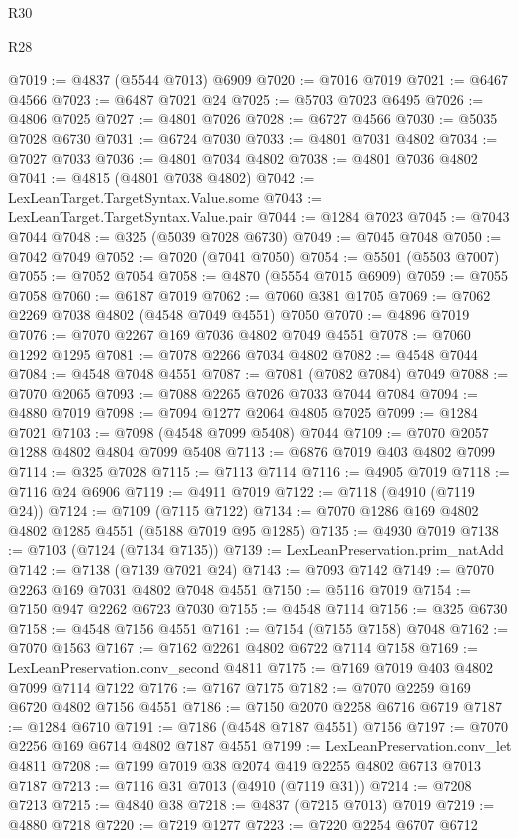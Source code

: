 \begin{lexlean}{R30}
\begin{lexlean}{R28}
\begin{coremodule}
{{{{{{{{{{{{{{{{{{{{{{{{{{{{{{{{{{{{{{{{{{{{{{{{{{{{{{{{{{{{{{{{{{{{{{{{{{{{{{{{{{{{{{{{{{{{{{{{{{{{{{{{{{{{{{{{{{{{{{{{{{{{{{{{{{{{{{{{{{{{{{{@7019 := @4837 (@5544 @7013) @6909
@7020 := @7016 @7019
@7021 := @6467 @4566
@7023 := @6487 @7021 @24
@7025 := @5703 @7023 @6495
@7026 := @4806 @7025
@7027 := @4801 @7026
@7028 := @6727 @4566
@7030 := @5035 @7028 @6730
@7031 := @6724 @7030
@7033 := @4801 @7031 @4802
@7034 := @7027 @7033
@7036 := @4801 @7034 @4802
@7038 := @4801 @7036 @4802
@7041 := @4815 (@4801 @7038 @4802)
@7042 := LexLeanTarget.TargetSyntax.Value.some
@7043 := LexLeanTarget.TargetSyntax.Value.pair
@7044 := @1284 @7023
@7045 := @7043 @7044
@7048 := @325 (@5039 @7028 @6730)
@7049 := @7045 @7048
@7050 := @7042 @7049
@7052 := @7020 (@7041 @7050)
@7054 := @5501 (@5503 @7007)
@7055 := @7052 @7054
@7058 := @4870 (@5554 @7015 @6909)
@7059 := @7055 @7058
@7060 := @6187 @7019
@7062 := @7060 @381 @1705
@7069 := @7062 @2269 @7038 @4802 (@4548 @7049 @4551) @7050
@7070 := @4896 @7019
@7076 := @7070 @2267 @169 @7036 @4802 @7049 @4551
@7078 := @7060 @1292 @1295
@7081 := @7078 @2266 @7034 @4802
@7082 := @4548 @7044
@7084 := @4548 @7048 @4551
@7087 := @7081 (@7082 @7084) @7049
@7088 := @7070 @2065
@7093 := @7088 @2265 @7026 @7033 @7044 @7084
@7094 := @4880 @7019
@7098 := @7094 @1277 @2064 @4805 @7025
@7099 := @1284 @7021
@7103 := @7098 (@4548 @7099 @5408) @7044
@7109 := @7070 @2057 @1288 @4802 @4804 @7099 @5408
@7113 := @6876 @7019 @403 @4802 @7099
@7114 := @325 @7028
@7115 := @7113 @7114
@7116 := @4905 @7019
@7118 := @7116 @24 @6906
@7119 := @4911 @7019
@7122 := @7118 (@4910 (@7119 @24))
@7124 := @7109 (@7115 @7122)
@7134 := @7070 @1286 @169 @4802 @4802 @1285 @4551 (@5188 @7019 @95 @1285)
@7135 := @4930 @7019
@7138 := @7103 (@7124 (@7134 @7135))
@7139 := LexLeanPreservation.prim_natAdd
@7142 := @7138 (@7139 @7021 @24)
@7143 := @7093 @7142
@7149 := @7070 @2263 @169 @7031 @4802 @7048 @4551
@7150 := @5116 @7019
@7154 := @7150 @947 @2262 @6723 @7030
@7155 := @4548 @7114
@7156 := @325 @6730
@7158 := @4548 @7156 @4551
@7161 := @7154 (@7155 @7158) @7048
@7162 := @7070 @1563
@7167 := @7162 @2261 @4802 @6722 @7114 @7158
@7169 := LexLeanPreservation.conv_second @4811
@7175 := @7169 @7019 @403 @4802 @7099 @7114 @7122
@7176 := @7167 @7175
@7182 := @7070 @2259 @169 @6720 @4802 @7156 @4551
@7186 := @7150 @2070 @2258 @6716 @6719
@7187 := @1284 @6710
@7191 := @7186 (@4548 @7187 @4551) @7156
@7197 := @7070 @2256 @169 @6714 @4802 @7187 @4551
@7199 := LexLeanPreservation.conv_let @4811
@7208 := @7199 @7019 @38 @2074 @419 @2255 @4802 @6713 @7013 @7187
@7213 := @7116 @31 @7013 (@4910 (@7119 @31))
@7214 := @7208 @7213
@7215 := @4840 @38
@7218 := @4837 (@7215 @7013) @7019
@7219 := @4880 @7218
@7220 := @7219 @1277
@7223 := @7220 @2254 @6707 @6712
}}}}}}}}}}}}}}}}}}}}}}}}}}}}}}}}}}}}}}}}}}}}}}}}}}}}}}}}}}}}}}}}}}}}}}}}}}}}}}}}}}}}}}}}}}}}}}}}}}}}}}}}}}}}}}}}}}}}}}}}}}}}}}}}}}}}}}}}}}}}}}}
\end{coremodule}
\end{lexlean}
\end{lexlean}
